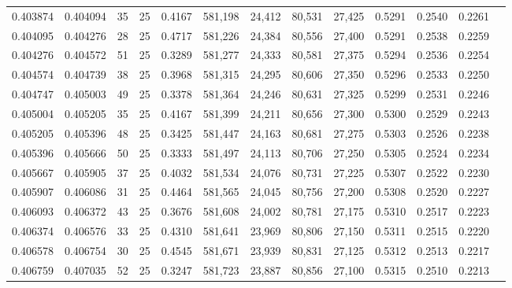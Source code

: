 \begin{tabular}{rrrrrrrrrrrrr}
0.403874 & 0.404094 &    35 &  25 &                                     0.4167 & 581,198 &  24,412 &  80,531 &  27,425 & 0.5291 & 0.2540 & 0.2261 \\
0.404095 & 0.404276 &    28 &  25 &                                     0.4717 & 581,226 &  24,384 &  80,556 &  27,400 & 0.5291 & 0.2538 & 0.2259 \\
0.404276 & 0.404572 &    51 &  25 &                                     0.3289 & 581,277 &  24,333 &  80,581 &  27,375 & 0.5294 & 0.2536 & 0.2254 \\
0.404574 & 0.404739 &    38 &  25 &                                     0.3968 & 581,315 &  24,295 &  80,606 &  27,350 & 0.5296 & 0.2533 & 0.2250 \\
0.404747 & 0.405003 &    49 &  25 &                                     0.3378 & 581,364 &  24,246 &  80,631 &  27,325 & 0.5299 & 0.2531 & 0.2246 \\
0.405004 & 0.405205 &    35 &  25 &                                     0.4167 & 581,399 &  24,211 &  80,656 &  27,300 & 0.5300 & 0.2529 & 0.2243 \\
0.405205 & 0.405396 &    48 &  25 &                                     0.3425 & 581,447 &  24,163 &  80,681 &  27,275 & 0.5303 & 0.2526 & 0.2238 \\
0.405396 & 0.405666 &    50 &  25 &                                     0.3333 & 581,497 &  24,113 &  80,706 &  27,250 & 0.5305 & 0.2524 & 0.2234 \\
0.405667 & 0.405905 &    37 &  25 &                                     0.4032 & 581,534 &  24,076 &  80,731 &  27,225 & 0.5307 & 0.2522 & 0.2230 \\
0.405907 & 0.406086 &    31 &  25 &                                     0.4464 & 581,565 &  24,045 &  80,756 &  27,200 & 0.5308 & 0.2520 & 0.2227 \\
0.406093 & 0.406372 &    43 &  25 &                                     0.3676 & 581,608 &  24,002 &  80,781 &  27,175 & 0.5310 & 0.2517 & 0.2223 \\
0.406374 & 0.406576 &    33 &  25 &                                     0.4310 & 581,641 &  23,969 &  80,806 &  27,150 & 0.5311 & 0.2515 & 0.2220 \\
0.406578 & 0.406754 &    30 &  25 &                                     0.4545 & 581,671 &  23,939 &  80,831 &  27,125 & 0.5312 & 0.2513 & 0.2217 \\
0.406759 & 0.407035 &    52 &  25 &                                     0.3247 & 581,723 &  23,887 &  80,856 &  27,100 & 0.5315 & 0.2510 & 0.2213 \\

\end{tabular}
